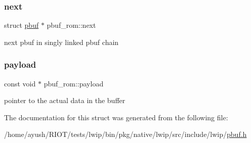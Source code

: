 \subsubsection{\texorpdfstring{next}{next}}
{\footnotesize\ttfamily struct \hyperlink{structpbuf}{pbuf} $\ast$ pbuf\+\_\+rom\+::next}

next pbuf in singly linked pbuf chain \mbox{\label{structpbuf__rom_a7fe9a84bcf524bae1898941aefee1ad5}} 
\subsubsection{\texorpdfstring{payload}{payload}}
{\footnotesize\ttfamily const void $\ast$ pbuf\+\_\+rom\+::payload}

pointer to the actual data in the buffer 

The documentation for this struct was generated from the following file\+:\begin{DoxyCompactItemize}
\item 
/home/ayush/\+R\+I\+O\+T/tests/lwip/bin/pkg/native/lwip/src/include/lwip/\hyperlink{native_2lwip_2src_2include_2lwip_2pbuf_8h}{pbuf.\+h}\end{DoxyCompactItemize}
